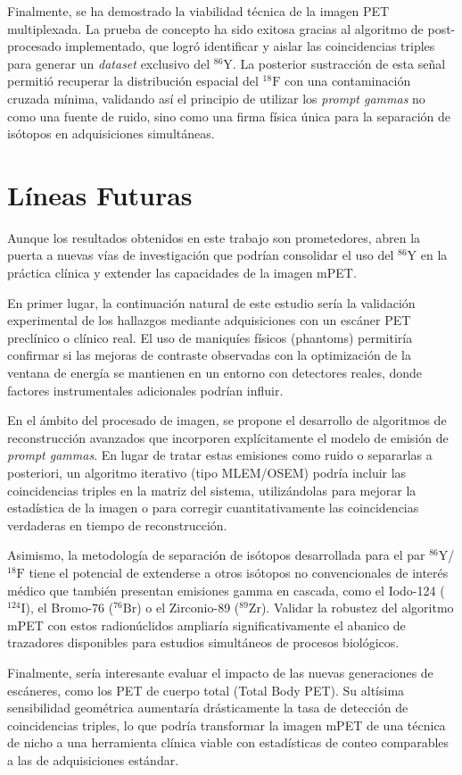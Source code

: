 Finalmente, se ha demostrado la viabilidad técnica de la imagen PET multiplexada. La prueba de concepto ha sido exitosa gracias al algoritmo de post-procesado implementado, que logró identificar y aislar las coincidencias triples para generar un \textit{dataset} exclusivo del $^{86}\text{Y}$. La posterior sustracción de esta señal permitió recuperar la distribución espacial del $^{18}\text{F}$ con una contaminación cruzada mínima, validando así el principio de utilizar los \textit{prompt gammas} no como una fuente de ruido, sino como una firma física única para la separación de isótopos en adquisiciones simultáneas.

\section{Líneas Futuras}
\label{sec:conclusiones:lineas_futuras}

Aunque los resultados obtenidos en este trabajo son prometedores, abren la puerta a nuevas vías de investigación que podrían consolidar el uso del $^{86}\text{Y}$ en la práctica clínica y extender las capacidades de la imagen mPET.

En primer lugar, la continuación natural de este estudio sería la validación experimental de los hallazgos mediante adquisiciones con un escáner PET preclínico o clínico real. El uso de maniquíes físicos (phantoms) permitiría confirmar si las mejoras de contraste observadas con la optimización de la ventana de energía se mantienen en un entorno con detectores reales, donde factores instrumentales adicionales podrían influir.

En el ámbito del procesado de imagen, se propone el desarrollo de algoritmos de reconstrucción avanzados que incorporen explícitamente el modelo de emisión de \textit{prompt gammas}. En lugar de tratar estas emisiones como ruido o separarlas a posteriori, un algoritmo iterativo (tipo MLEM/OSEM) podría incluir las coincidencias triples en la matriz del sistema, utilizándolas para mejorar la estadística de la imagen o para corregir cuantitativamente las coincidencias verdaderas en tiempo de reconstrucción.

Asimismo, la metodología de separación de isótopos desarrollada para el par $^{86}\text{Y}$/$^{18}\text{F}$ tiene el potencial de extenderse a otros isótopos no convencionales de interés médico que también presentan emisiones gamma en cascada, como el Iodo-124 ($^{124}\text{I}$), el Bromo-76 ($^{76}\text{Br}$) o el Zirconio-89 ($^{89}\text{Zr}$). Validar la robustez del algoritmo mPET con estos radionúclidos ampliaría significativamente el abanico de trazadores disponibles para estudios simultáneos de procesos biológicos.

Finalmente, sería interesante evaluar el impacto de las nuevas generaciones de escáneres, como los PET de cuerpo total (Total Body PET). Su altísima sensibilidad geométrica aumentaría drásticamente la tasa de detección de coincidencias triples, lo que podría transformar la imagen mPET de una técnica de nicho a una herramienta clínica viable con estadísticas de conteo comparables a las de adquisiciones estándar.


